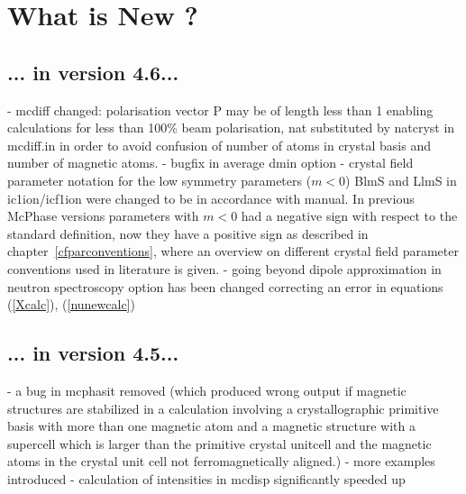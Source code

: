 \documentclass[twoside]{article}
\begin{document}
\section*{What is New ?}

\subsection*{... in version 4.6...}

- mcdiff changed: polarisation vector P may be of length less than 1 enabling calculations for
   less than 100\% beam polarisation, nat substituted by natcryst in mcdiff.in in order to
  avoid confusion of number of atoms in crystal basis and number of magnetic atoms.
- bugfix in average dmin option
- crystal field parameter notation for the low symmetry parameters
  ($m<0$) BlmS and LlmS in ic1ion/icf1ion were changed to be in accordance
  with manual. In previous McPhase versions
  parameters with $m<0$ had a negative sign with respect to the
  standard definition,  now they have a positive sign as described 
  in chapter~\ref{cfparconventions}, where an overview on different
  crystal field parameter conventions used in literature is given.
- going beyond dipole approximation in neutron spectroscopy option
  has been changed correcting an error in equations (\ref{Xcalc}), (\ref{nunewcalc})

\subsection*{... in version 4.5...}
 - a bug in mcphasit removed (which produced wrong output if magnetic structures are stabilized in a calculation involving a
   crystallographic primitive basis with more than one magnetic atom and a magnetic structure with a supercell which is 
  larger than the primitive crystal unitcell and the magnetic atoms in the crystal unit cell not ferromagnetically aligned.)
- more examples introduced
- calculation of intensities in mcdisp significantly speeded up
\end{document}
